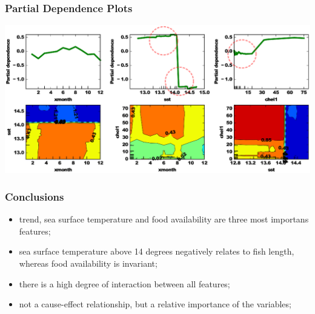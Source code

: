 \documentclass{beamer}
\begin{document}

\begin{frame}
\frametitle{Partial Dependence Plots}
\includegraphics[scale=0.47]{../fig/partdepCS-present}
\end{frame}

\begin{frame}
\frametitle{Conclusions}
\begin{itemize}
    \item <+-| alert@+> trend, sea surface temperature and food availability are three most importans features;
    \item <+-| alert@+> sea surface temperature above 14 degrees negatively relates to fish length, whereas food availability is invariant; %
    \item <+-| alert@+> there is a high degree of interaction between all features;
    \item <+-| alert@+> not a cause-effect relationship, but a relative importance of the variables;
\end{itemize}
\end{frame}
\end{document}
